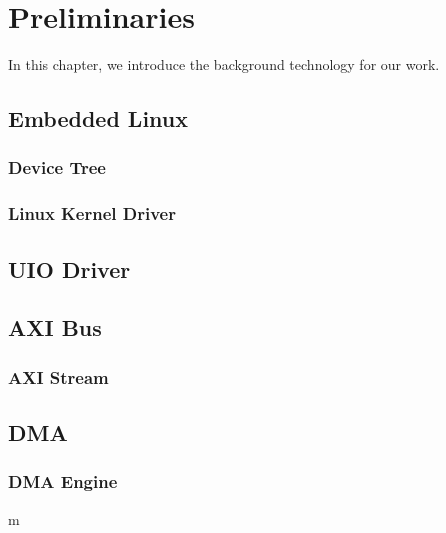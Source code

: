 \chapter{Preliminaries}
\label{cha:Preliminaries}
In this chapter, we introduce the background technology for our work. 



\section{Embedded Linux}
\label{sec:Embedded}

\subsection{Device Tree}
\label{subsec:Device Tree}


\subsection{Linux Kernel Driver}
\label{subsec:Linux Kernel Driver}



\section{UIO Driver}
\label{sec:UIO Driver}

\section{AXI Bus}
\label{sec:AXI Bus}


\subsection{AXI Stream }
\label{subsec:AXI Stream}

\section{DMA}
\label{sec:DMA}

\subsection{DMA Engine }
\label{subsec:DMA Engine}m